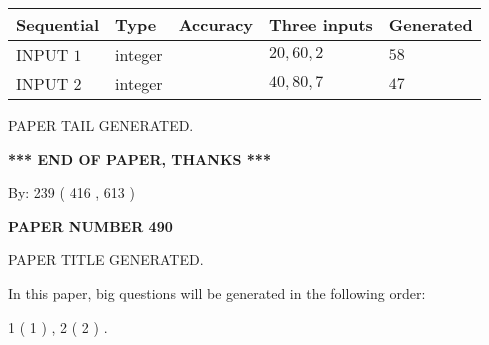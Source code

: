 \documentclass{ctexart}
\begin{document}
   
  
  
\noindent\begin{tabular}{|l|l|l|l|l|}
\hline
 Sequential & Type & Accuracy & Three inputs & Generated \\ 
\hline
 
 
  INPUT $  1 $ & integer &  & $
 20
 , 
 60
 , 
 2
 $ & $ 58 $ 
 \\  \hline  
 
 
  INPUT $  2 $ & integer &  & $
 40
 , 
 80
 , 
 7
 $ & $ 47 $ 
 \\  \hline  
 \end{tabular}
   
   
   
   
   
   
 \vspace{0.2in}
 
   
   
\vspace{2.0in} PAPER TAIL GENERATED.
   
   
   
   
\vspace{1.0in} 
{\textbf{\large{ *** END OF PAPER, THANKS *** }}} 
   
   
\hspace{1.0in} By: 
 239 ( 416 ,  613 )
   
   
   
   
\newpage 
\setcounter{page}{ 
   490001 } 
   
   
   
   
 {\textbf{ \Large{ PAPER NUMBER  490  }}}
   
   
\vspace{0.2in}
   
   
   
   
   
   
   
   
 \vspace{0.2in}
 
 
 
 
   
   
 PAPER TITLE GENERATED.
   
   
   
\vspace{0.2in}
   
In this paper, big questions will be generated in the following order: 
   
   
   1 ( 1 )
 ,
   2 ( 2 )
 .
  
\end{document}
